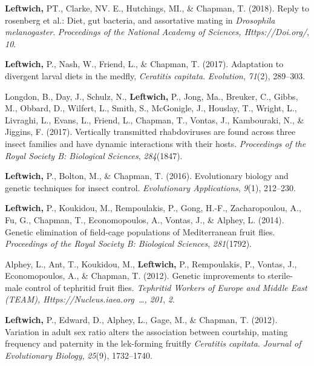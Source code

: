 \documentclass[11pt, a4paper]{awesome-cv}
\begin{document}
\leavevmode\hypertarget{ref-8}{}%
\textbf{Leftwich,} PT., Clarke, NV. E., Hutchings, MI., \& Chapman, T.
(2018). Reply to rosenberg et al.: Diet, gut bacteria, and assortative
mating in \emph{{Drosophila} melanogaster}. \emph{Proceedings of the
National Academy of Sciences, Https://Doi.org/}, \emph{10}.

\leavevmode\hypertarget{ref-9}{}%
\textbf{Leftwich,} P., Nash, W., Friend, L., \& Chapman, T. (2017).
Adaptation to divergent larval diets in the medfly, \emph{{Ceratitis}
capitata}. \emph{Evolution}, \emph{71}(2), 289--303.

\leavevmode\hypertarget{ref-7}{}%
Longdon, B., Day, J., Schulz, N., \textbf{Leftwich,} P., Jong, Ma.,
Breuker, C., Gibbs, M., Obbard, D., Wilfert, L., Smith, S., McGonigle,
J., Houslay, T., Wright, L., Livraghi, L., Evans, L., Friend, L.,
Chapman, T., Vontas, J., Kambouraki, N., \& Jiggins, F. (2017).
Vertically transmitted rhabdoviruses are found across three insect
families and have dynamic interactions with their hosts.
\emph{Proceedings of the Royal Society B: Biological Sciences},
\emph{284}(1847).

\leavevmode\hypertarget{ref-1}{}%
\textbf{Leftwich,} P., Bolton, M., \& Chapman, T. (2016). Evolutionary
biology and genetic techniques for insect control. \emph{Evolutionary
Applications}, \emph{9}(1), 212--230.

\leavevmode\hypertarget{ref-2}{}%
\textbf{Leftwich,} P., Koukidou, M., Rempoulakis, P., Gong, H.-F.,
Zacharopoulou, A., Fu, G., Chapman, T., Economopoulos, A., Vontas, J.,
\& Alphey, L. (2014). Genetic elimination of field-cage populations of
{Mediterranean} fruit flies. \emph{Proceedings of the Royal Society B:
Biological Sciences}, \emph{281}(1792).

\leavevmode\hypertarget{ref-18}{}%
Alphey, L., Ant, T., Koukidou, M., \textbf{Leftwich,} P., Rempoulakis,
P., Vontas, J., Economopoulos, A., \& Chapman, T. (2012). Genetic
improvements to sterile-male control of tephritid fruit flies.
\emph{Tephritid Workers of Europe and Middle East (TEAM),
Https://Nucleus.iaea.org~\ldots, 201}, \emph{2}.

\leavevmode\hypertarget{ref-4}{}%
\textbf{Leftwich,} P., Edward, D., Alphey, L., Gage, M., \& Chapman, T.
(2012). Variation in adult sex ratio alters the association between
courtship, mating frequency and paternity in the lek-forming fruitfly
\emph{{Ceratitis} capitata}. \emph{Journal of Evolutionary Biology},
\emph{25}(9), 1732--1740.

\endgroup
\end{document}
